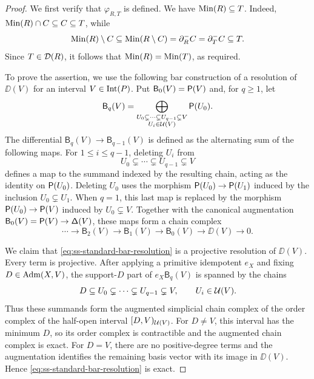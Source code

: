 \begin{proof}
We first verify that $\varphi_{R,T}$ is defined.
We have $\operatorname{Min}(R)\subseteq T$.  Indeed,
$\operatorname{Min}(R)\cap C\subseteq C\subseteq T$, while
\[
\operatorname{Min}(R)\setminus C
\subseteq
\operatorname{Min}(R\setminus C)
=
\partial_R^-C
=
\partial_T^-C
\subseteq T.
\]
Since $T\in\mathcal D(R)$, it follows that
$\operatorname{Min}(R)=\operatorname{Min}(T)$, as required. 

To prove the assertion, we use the following bar construction of a resolution of $\DD(V)$ for an interval $V\in\operatorname{Int}(P)$.
Put
$\mathsf B_0(V)=\mathsf P(V)$ and, for $q\geq1$, let
\begin{equation}
\label{eq:ss-standard-bar-terms}
\mathsf B_q(V)
=
\bigoplus_{\substack{
U_0\subsetneq\cdots\subsetneq U_{q-1}\subsetneq V\\
U_i\in\mathcal U(V)}}
\mathsf P(U_0).
\end{equation}
The differential
$\mathsf B_q(V)\to\mathsf B_{q-1}(V)$ is defined as the alternating sum of the
following maps.  For $1\leq i\leq q-1$, deleting $U_i$ from
\[
U_0\subsetneq\cdots\subsetneq U_{q-1}\subsetneq V
\]
defines a map to the summand indexed by the resulting chain, acting as
the identity on $\mathsf P(U_0)$.  Deleting $U_0$ uses the morphism
$\mathsf P(U_0)\to\mathsf P(U_1)$ induced by the inclusion $U_0\subsetneq U_1$.
When $q=1$, this last map is replaced by the morphism
$\mathsf P(U_0)\to\mathsf P(V)$ induced by $U_0\subsetneq V$.
Together with the canonical augmentation
$\mathsf B_0(V)=\mathsf P(V)\to\mathsf\Delta(V)$, these maps form a chain complex
\begin{equation}
\label{eq:ss-standard-bar-resolution}
\cdots
\longrightarrow
\mathsf B_2(V)
\longrightarrow
\mathsf B_1(V)
\longrightarrow
\mathsf B_0(V)
\longrightarrow
\DD(V)
\longrightarrow
0.
\end{equation}

We claim that \eqref{eq:ss-standard-bar-resolution} is a projective
resolution of $\DD(V)$.  Every term is projective.  
After applying a primitive idempotent $e_X$ and fixing
$D\in\operatorname{Adm}(X,V)$, the support-$D$ part of $e_X\mathsf B_q(V)$ is
spanned by the chains
\[
D\subseteq U_0\subsetneq\cdots\subsetneq U_{q-1}\subsetneq V,
\qquad
U_i\in\mathcal U(V).
\]
Thus these summands form the augmented simplicial chain complex of the
order complex of the half-open interval $[D,V)_{\mathcal U(V)}$.
For $D\neq V$, this interval has the minimum $D$, so its order complex
is contractible and the augmented chain complex is exact.  For $D=V$,
there are no positive-degree terms and the augmentation identifies
the remaining basis vector with its image in $\DD(V)$.  Hence
\eqref{eq:ss-standard-bar-resolution} is exact.



\end{proof}
